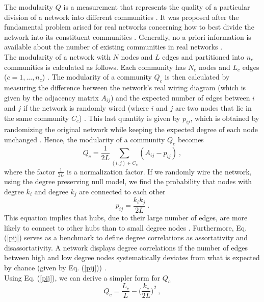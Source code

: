 \documentclass[11 pt , letterpaper , twoside , openright]{book}
\begin{document}
The modularity $Q$ is a measurement that represents the quality of a particular division of a network into different communities \cite{F.Costa2007}. It was proposed after the fundamental problem arised for real networks concerning how to best divide the network into its constituent communities \cite{F.Costa2007}. Generally, no a priori information is available about the number of existing communities in real networks \cite{F.Costa2007}.\\
\newline
The modularity of a network with $N$ nodes and $L$ edges and partitioned into $n_c$ communities is calculated as follows. Each community has $N_c$ nodes and $L_c$ edges ($c = 1,..., n_c$) \cite{Albert2016}. The modularity of a community $Q_c$ is then calculated by measuring the difference between the network's real wiring diagram (which is given by the adjacency matrix $A_{ij}$) and the expected number of edges between $i$ and $j$ if the network is randomly wired (where $i$ and $j$ are two nodes that lie in the same community $C_c$) \cite{Albert2016}. This last quantity is given by $p_{ij}$, which is obtained by randomizing the original network while keeping the expected degree of each node unchanged \cite{Albert2016}. Hence, the modularity of a community $Q_c$ becomes \cite{Albert2016}
\begin{equation}
	Q_c = \frac{1}{2L}\sum_{(i,j) \in C_c} (A_{ij} - p_{ij}) \ ,
\end{equation}
where the factor $\frac{1}{2L}$ is a normalization factor. If we randomly wire the network, using the degree preserving null model, we find the probability that nodes with degree $k_i$ and degree $k_j$ are connected to each other \cite{Bara2016}
\begin{equation}\label{pij}
	p_{ij} = \frac{k_ik_j}{2L} \ .
\end{equation}
This equation implies that hubs, due to their large number of edges, are more likely to connect to other hubs than to small degree nodes \cite{Bara2016}. Furthermore, Eq. (\ref{pij}) serves as a benchmark to define degree correlations as assortativity and disassortativity. A network displays degree correlations if the number of edges between high and low degree nodes systematically deviates from what is expected by chance (given by Eq. (\ref{pij})) \cite{Bara2016}. \\
\newline
Using Eq. (\ref{pij}), we can derive a simpler form for $Q_c$
\begin{equation}\label{Qc}
	Q_c = \frac{L_c}{L} - \bigg(\frac{k_c}{2L}\bigg)^2 \ ,
\end{equation}
\end{document}

